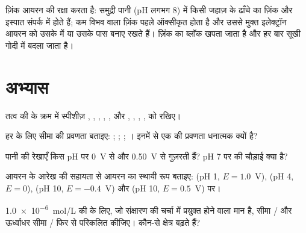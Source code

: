 ज़िंक आयरन की रक्षा करता है: समुद्री पानी (pH लगभग 8) में किसी जहाज़ के ढाँचे का ज़िंक और
इस्पात संपर्क में होते हैं; कम विभव वाला ज़िंक पहले ऑक्सीकृत होता है और
उससे मुक्त इलेक्ट्रॉन आयरन को उसके  में या उसके पास बनाए रखते हैं।
ज़िंक का ब्लॉक खपता जाता है और हर बार सूखी गोदी में बदला जाता है।

\section{अभ्यास}

\begin{exercise}[$\star$]\label{exo:b1:e-ph-diagrams:1}
तत्व की  के क्रम में स्पीशीज़ , ,
, , , और , , ,
,  को रखिए।
\end{exercise}

\begin{exercise}[$\star$]\label{exo:b1:e-ph-diagrams:2}
हर  के लिए सीमा की प्रवणता बताइए:
; ;
; ।
इनमें से एक की प्रवणता धनात्मक क्यों है?
\end{exercise}

\begin{exercise}[$\star$]\label{exo:b1:e-ph-diagrams:3}
पानी की रेखाएँ किस pH पर 0~V से और
\qty{0.50}{V} से गुज़रती हैं? pH 7 पर  की चौड़ाई
क्या है?
\end{exercise}

\begin{exercise}[$\star$]\label{exo:b1:e-ph-diagrams:4}
आयरन के आरेख की सहायता से आयरन का स्थायी रूप बताइए:
(pH 1, $E = 1.0$~V), (pH 4, $E = 0$), (pH 10, $E = -0.4$~V) और
(pH 10, $E = 0.5$~V) पर।
\end{exercise}

\begin{exercise}[$\star\star$]\label{exo:b1:e-ph-diagrams:5}
\qty{1.0e-6}{mol/L} की  के लिए, जो संक्षारण की चर्चा में
प्रयुक्त होने वाला मान है, सीमा / और ऊर्ध्वाधर सीमा
/ फिर से परिकलित कीजिए। कौन-से क्षेत्र
बढ़ते हैं?
\end{exercise}

